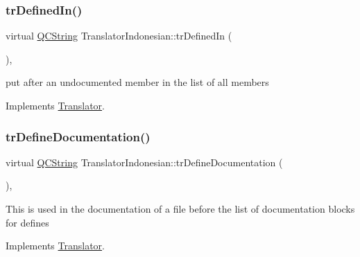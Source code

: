 \mbox{\label{class_translator_indonesian_ac56dabfcc84c4900f6c47358570d3fb0}} 
\subsubsection{\texorpdfstring{trDefinedIn()}{trDefinedIn()}}
{\footnotesize\ttfamily virtual \mbox{\hyperlink{class_q_c_string}{Q\+C\+String}} Translator\+Indonesian\+::tr\+Defined\+In (\begin{DoxyParamCaption}{ }\end{DoxyParamCaption})\hspace{0.3cm}{\ttfamily [inline]}, {\ttfamily [virtual]}}

put after an undocumented member in the list of all members 

Implements \mbox{\hyperlink{class_translator}{Translator}}.

\mbox{\label{class_translator_indonesian_a3be6e050076255b99155cd2bc1371042}} 
\subsubsection{\texorpdfstring{trDefineDocumentation()}{trDefineDocumentation()}}
{\footnotesize\ttfamily virtual \mbox{\hyperlink{class_q_c_string}{Q\+C\+String}} Translator\+Indonesian\+::tr\+Define\+Documentation (\begin{DoxyParamCaption}{ }\end{DoxyParamCaption})\hspace{0.3cm}{\ttfamily [inline]}, {\ttfamily [virtual]}}

This is used in the documentation of a file before the list of documentation blocks for defines 

Implements \mbox{\hyperlink{class_translator}{Translator}}.

\mbox{\label{class_translator_indonesian_a907192fe0680ea02b69c3b1912a96872}} 
